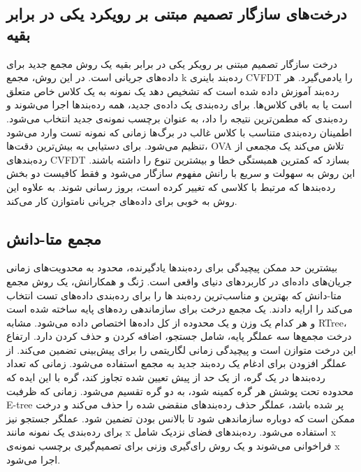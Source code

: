 \subsection{درخت‌های سازگار تصمیم مبتنی بر رویکرد یکی در برابر بقیه }
درخت سازگار تصمیم مبتنی بر رویکر یکی در برابر بقیه  یک روش مجمع جدید برای داده‌های جریانی است. در این روش، مجمع k رده‌بند باینری CVFDT را یادمی‌گیرد. هر رده‌بند آموزش‌ داده شده است که تشخیص دهد یک نمونه به یک کلاس خاص متعلق است یا به باقی کلاس‌ها. برای رده‌بندی یک داده‌ی جدید، همه رده‌بندها اجرا می‌شوند و رده‌بندی که مطمن‌ترین نتیجه را داد، به عنوان برچسب نمونه‌ی جدید انتخاب می‌شود. اطمینان رده‌بندی متناسب با کلاس غالب در برگ‌ها زمانی که نمونه تست وارد می‌شود تنظیم می‌شود. برای دستیابی به بیش‌ترین دقت‌ها، OVA تلاش می‌کند یک مجمعی از رده‌بندهای CVFDT بسازد که کمترین همبستگی‌ خطا و بیشترین تنوع را داشته باشند. این روش به سهولت و سریع با رانش‌ مفهوم سازگار می‌شود و فقط کافیست دو بخش رده‌بندها که مرتبط با کلاسی که تغییر کرده است، بروز رسانی شوند. به علاوه این روش به خوبی برای داده‌های جریانی نامتوازن کار می‌کند.

\subsection{مجمع متا-دانش}

بیشترین حد ممکن پیچیدگی برای رده‌بندها یادگیرنده، محدود به محدویت‌های زمانی جریان‌های داده‌ای در کاربردهای دنیای واقعی است. ژنگ
و همکارانش، یک روش مجمع  متا-دانش
که بهترین و مناسب‌ترین رده‌بند ها را برای رده‌بندی داده‌های تست انتخاب می‌کند را ارایه دادند.
یک مجمع درخت برای سازماندهی رده‌های پایه ساخته شده است و هر‌ کدام یک وزن و یک محدوده از کل داده‌ها اختصاص داده می‌شود. مشابه RTree، درخت مجمع‌ها سه عملگر پایه، شامل جستجو، اضافه کردن و حذف کردن دارد. ارتفاع این درخت متوازن است و پیچیدگی زمانی لگاریتمی را برای پیش‌بینی تضمین می‌کند. از عملگر افزودن برای ادغام یک رده‌بند جدید به مجمع استفاده می‌شود. زمانی که تعداد رده‌بندها در یک گره، از یک حد از پیش تعیین شده تجاوز کند، گره با این ایده که محدوده تحت پوشش هر گره کمینه شود،‌ به دو گره تقسیم‌ می‌شود. زمانی که ظرفبت E-tree پر شده باشد، عملگر حذف رده‌بندهای منقضی شده را حذف می‌کند و درخت ممکن است که دوباره سازماندهی شود تا بالانس بودن تضمین شود.
عملگر جستجو نیز برای رده‌بندی یک نمونه مانند x استفاده می‌شود. رده‌بندهای فضای نزدیک شامل x فراخوانی می‌شوند و یک روش رای‌گیری وزنی برای تصمیم‌گیری برچسب نمونه‌ی x اجرا می‌شود.

